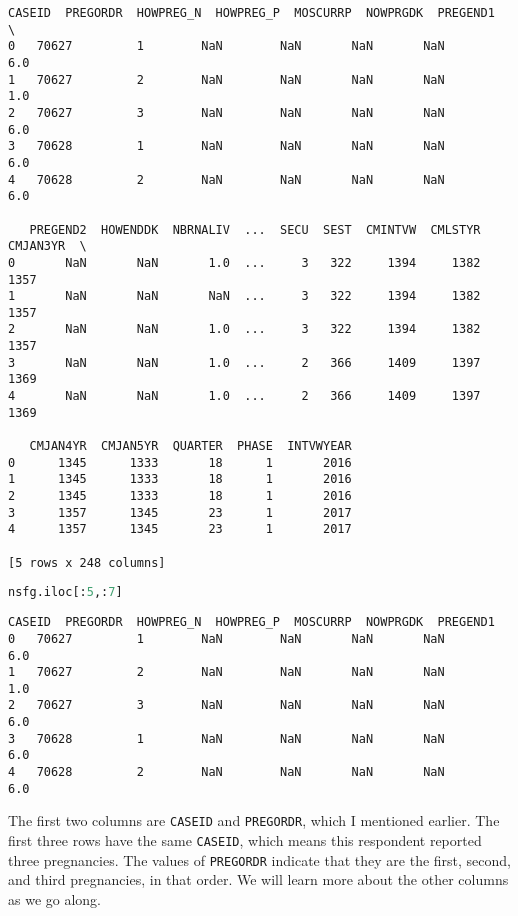 \begin{lstlisting}[style=output]
   CASEID  PREGORDR  HOWPREG_N  HOWPREG_P  MOSCURRP  NOWPRGDK  PREGEND1  \
0   70627         1        NaN        NaN       NaN       NaN       6.0   
1   70627         2        NaN        NaN       NaN       NaN       1.0   
2   70627         3        NaN        NaN       NaN       NaN       6.0   
3   70628         1        NaN        NaN       NaN       NaN       6.0   
4   70628         2        NaN        NaN       NaN       NaN       6.0   

   PREGEND2  HOWENDDK  NBRNALIV  ...  SECU  SEST  CMINTVW  CMLSTYR  CMJAN3YR  \
0       NaN       NaN       1.0  ...     3   322     1394     1382      1357   
1       NaN       NaN       NaN  ...     3   322     1394     1382      1357   
2       NaN       NaN       1.0  ...     3   322     1394     1382      1357   
3       NaN       NaN       1.0  ...     2   366     1409     1397      1369   
4       NaN       NaN       1.0  ...     2   366     1409     1397      1369   

   CMJAN4YR  CMJAN5YR  QUARTER  PHASE  INTVWYEAR  
0      1345      1333       18      1       2016  
1      1345      1333       18      1       2016  
2      1345      1333       18      1       2016  
3      1357      1345       23      1       2017  
4      1357      1345       23      1       2017  

[5 rows x 248 columns]
\end{lstlisting}

\begin{lstlisting}[language=Python,style=source]
nsfg.iloc[:5,:7]
\end{lstlisting}

\begin{lstlisting}[style=output]
   CASEID  PREGORDR  HOWPREG_N  HOWPREG_P  MOSCURRP  NOWPRGDK  PREGEND1
0   70627         1        NaN        NaN       NaN       NaN       6.0
1   70627         2        NaN        NaN       NaN       NaN       1.0
2   70627         3        NaN        NaN       NaN       NaN       6.0
3   70628         1        NaN        NaN       NaN       NaN       6.0
4   70628         2        NaN        NaN       NaN       NaN       6.0
\end{lstlisting}

The first two columns are \passthrough{\lstinline!CASEID!} and
\passthrough{\lstinline!PREGORDR!}, which I mentioned earlier. The first
three rows have the same \passthrough{\lstinline!CASEID!}, which means
this respondent reported three pregnancies. The values of
\passthrough{\lstinline!PREGORDR!} indicate that they are the first,
second, and third pregnancies, in that order. We will learn more about
the other columns as we go along.

